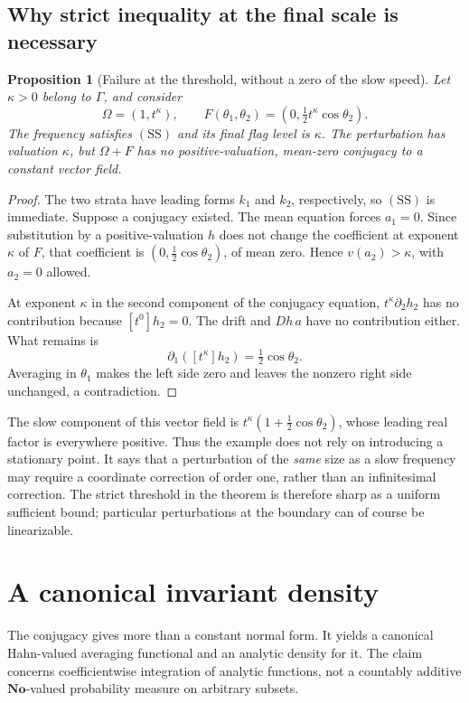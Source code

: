 \documentclass[11pt,letterpaper]{article}
\newtheorem{proposition}[theorem]{Proposition}
\theoremstyle{definition}
\theoremstyle{remark}
\newcommand{\No}{\mathbf{No}}
\newcommand{\SDcond}{\mathrm{SS}}
\numberwithin{equation}{section}
\begin{document}
\subsection{Why strict inequality at the final scale is necessary}

\begin{proposition}[Failure at the threshold, without a zero of the slow speed]
\label{prop:boundary}
Let $\kappa>0$ belong to $\Gamma$, and consider
\[
 \Omega=(1,t^\kappa),\qquad
 F(\theta_1,\theta_2)=\left(0,\tfrac12t^\kappa\cos\theta_2\right).
\]
The frequency satisfies $(\SDcond)$ and its final flag level is $\kappa$.
The perturbation has valuation $\kappa$, but $\Omega+F$ has no
positive-valuation, mean-zero conjugacy to a constant vector field.
\end{proposition}
\begin{proof}
The two strata have leading forms $k_1$ and $k_2$, respectively, so
$(\SDcond)$ is immediate.  Suppose a conjugacy existed.  The mean equation
forces $a_1=0$.  Since substitution by a positive-valuation $h$ does not
change the coefficient at exponent $\kappa$ of $F$, that coefficient is
$(0,\tfrac12\cos\theta_2)$, of mean zero.  Hence $v(a_2)>\kappa$, with
$a_2=0$ allowed.

At exponent $\kappa$ in the second component of the conjugacy equation,
$t^\kappa\partial_2h_2$ has no contribution because $[t^0]h_2=0$.
The drift and $Dh\,a$ have no contribution either.  What remains is
\[
 \partial_1([t^\kappa]h_2)=\tfrac12\cos\theta_2.
\]
Averaging in $\theta_1$ makes the left side zero and leaves the nonzero
right side unchanged, a contradiction.
\end{proof}

The slow component of this vector field is
$t^\kappa(1+\tfrac12\cos\theta_2)$, whose leading real factor is everywhere
positive.  Thus the example does not rely on introducing a stationary point.
It says that a perturbation of the \emph{same} size as a slow frequency may
require a coordinate correction of order one, rather than an infinitesimal
correction.  The strict threshold in the theorem is therefore sharp as a
uniform sufficient bound; particular perturbations at the boundary can of
course be linearizable.

\section{A canonical invariant density}
\label{sec:density}

The conjugacy gives more than a constant normal form.  It yields a canonical
Hahn-valued averaging functional and an analytic density for it.  The claim
concerns coefficientwise integration of analytic functions, not a
countably additive $\No$-valued probability measure on arbitrary subsets.
\end{document}
